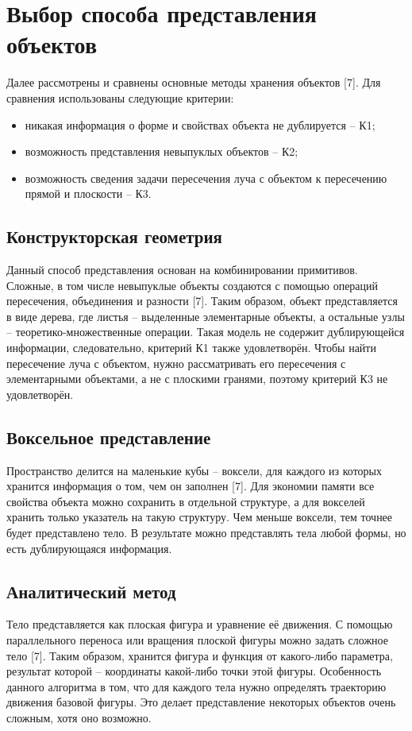 \section{Выбор способа представления объектов} {
    Далее рассмотрены и сравнены основные методы хранения объектов [7].
    Для сравнения использованы следующие критерии:
    \begin{itemize}
        \item никакая информация о форме и свойствах объекта
        не дублируется -- К1;
        \item возможность представления невыпуклых объектов -- К2;
        \item возможность сведения задачи пересечения луча с объектом
        к пересечению прямой и плоскости -- К3.
    \end{itemize}
    \subsection{Конструкторская геометрия} {
        Данный способ представления основан на комбинировании примитивов.
        Сложные, в том числе невыпуклые объекты создаются с помощью операций пересечения, объединения и разности [7].
        Таким образом, объект представляется в виде дерева,
        где листья -- выделенные элементарные объекты, а остальные узлы --
        теоретико-множественные операции.
        Такая модель не содержит дублирующейся информации, следовательно, критерий
        К1 также удовлетворён.
        Чтобы найти пересечение луча с объектом, нужно рассматривать его
        пересечения с элементарными объектами, а не с плоскими гранями,
        поэтому критерий К3 не удовлетворён.
    }
    \subsection{Воксельное представление} {
        Пространство делится на маленькие кубы -- воксели, для
        каждого из которых хранится информация о том, чем он заполнен [7].
        Для экономии памяти все свойства объекта можно сохранить в отдельной
        структуре, а для вокселей хранить только указатель на такую структуру.
        Чем меньше воксели, тем точнее будет представлено тело.
        В результате можно представлять тела любой формы,
        но есть дублирующаяся информация.
    }
    \subsection{Аналитический метод} {
        Тело представляется как плоская фигура и уравнение её движения.
        С помощью параллельного переноса или вращения плоской фигуры
        можно задать сложное тело [7].
        Таким образом, хранится фигура и функция от какого-либо параметра,
        результат которой -- координаты какой-либо точки этой фигуры.
        Особенность данного алгоритма в том, что для каждого тела нужно определять
        траекторию движения базовой фигуры.
        Это делает представление некоторых объектов очень сложным, хотя оно возможно.
    }
}
